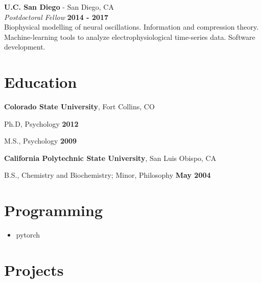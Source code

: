 \documentclass[margin,line]{res}
\newenvironment{list1}{
    \begin{list}{\ding{113}}{%
        \setlength{\itemsep}{0in}
        \setlength{\parsep}{0in} \setlength{\parskip}{0in}
        \setlength{\topsep}{0in} \setlength{\partopsep}{0in}
        \setlength{\leftmargin}{0.17in}}}{
    \end{list}}
\begin{document}
\begin{resume}
\vspace{-.1cm}
{\bf U.C. San Diego} - San Diego, CA\\
{\em Postdoctoral Fellow} \hfill {\bf 2014 - 2017}\\
Biophysical modelling of neural oscillations. Information and compression theory. Machine-learning tools to analyze electrophysiological time-series data. Software development.

\section{\sc Education}
{\bf Colorado State University}, Fort Collins, CO\\
\vspace*{-.15in}
\begin{list1}
    \tightlist
    \item[] Ph.D, Psychology \hfill {\bf 2012}
    \item[] M.S., Psychology \hfill {\bf 2009}
\end{list1}

\vspace*{-.1in}
{\bf California Polytechnic State University}, San Luis Obispo, CA\\
\vspace*{-.15in}
\begin{list1}
    \tightlist
    \item[] B.S., Chemistry and Biochemistry; Minor, Philosophy \hfill {\bf May 2004}
\end{list1}


\section{\sc Programming}
\begin{itemize}
      \tightlist
      \item pytorch
\end{itemize}


\section{\sc Projects}



\end{resume}
\end{document}
